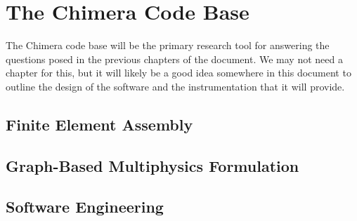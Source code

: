 \chapter{The Chimera Code Base}
\label{ch:chimera_codebase}

The Chimera code base will be the primary research tool for answering
the questions posed in the previous chapters of the document. We may
not need a chapter for this, but it will likely be a good idea
somewhere in this document to outline the design of the software and
the instrumentation that it will provide.

\section{Finite Element Assembly}
\label{ch:fem_assembly}

\section{Graph-Based Multiphysics Formulation}
\label{ch:multiphysics_graph}

\section{Software Engineering}
\label{ch:software_engineering}
